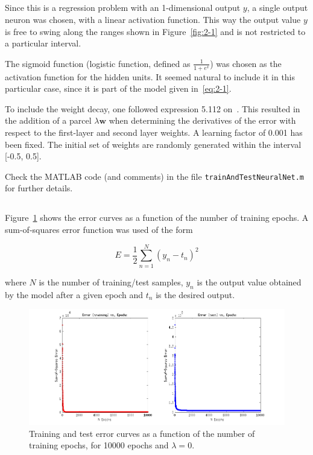 \documentclass[paper=a4, fontsize=11pt]{scrartcl} %
\numberwithin{equation}{section} %
\numberwithin{figure}{section} %
\numberwithin{table}{section} %
\newcommand{\vertbreak}{\vspace{1.75 mm}}
\begin{document}
\subsection{}
\label{subsec:2-2}

Since this is a regression problem with an 1-dimensional output $y$, a single 
output neuron was chosen, with a linear activation function. This way the output 
value $y$ is free to swing along the ranges shown in Figure~\ref{fig:2-1} and 
is not restricted to a particular interval.\vertbreak

The sigmoid function (logistic function, defined as $\frac{1}{1 + e^{x}}$) was 
chosen as the activation function for the hidden units. It seemed natural to 
include it in this 
particular case, since it is part of the model given in~\ref{eq:2-1}.\vertbreak

To include the weight decay, one followed expression 5.112 on~\cite{Bishop2006}. This 
resulted in the addition of a parcel $\lambda\textbf{w}$ when determining the 
derivatives of the error with respect to  the first-layer and second layer weights. 
A learning factor of 0.001 has been fixed. The initial set of weights are 
randomly generated within the interval [-0.5, 0.5].\vertbreak

Check the MATLAB code (and comments) in the file \verb+trainAndTestNeuralNet.m+ 
for further details.

\subsection{}
\label{subsec:2-3}

Figure~\ref{fig:2-3} shows the error curves as a function of the number of 
training epochs. A sum-of-squares error function was used of the form

\[E = \frac{1}{2}\sum_{n=1}^{N}(y_n - t_n)^2 \]

where $N$ is the number of training\slash test samples, $y_n$ is the output 
value obtained by the model after a given epoch and $t_n$ is the desired output.\vertbreak

\begin{figure}[h!]

    \centering
    \includegraphics[width=1.00\textwidth]{figures/2-3.png}
    \caption{Training and test error curves as a function of the number of 
        training epochs, for 10000 epochs and $\lambda = 0$.}
    \label{fig:2-3}

\end{figure}
\end{document}
